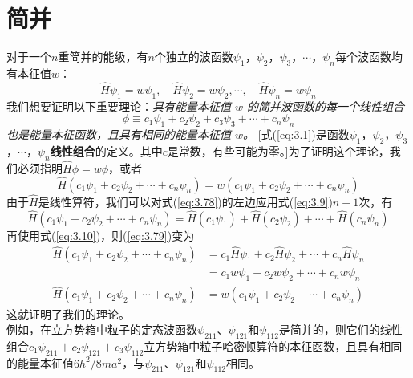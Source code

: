 \section{简并}
	对于一个$n$重简并的能级，有$n$个独立的波函数$\psi_1$，$\psi_2$，$\psi_3$，$\cdots$，$\psi_n$每个波函数均有本征值$w$：
	\begin{equation}
		\hat{H}\psi_1 = w\psi_1, \quad\hat{H}\psi_2 = w\psi_2, \cdots,\quad \hat{H}\psi_n = w\psi_n
		\label{eq:3.76}
	\end{equation}
	我们想要证明以下重要理论：\textit{具有能量本征值 $w$ 的简并波函数的每一个线性组合}
	\begin{equation}
		\phi \equiv c_1\psi_1 + c_2\psi_2 + c_3\psi_3 + \cdots + c_n\psi_n
		\label{eq:3.77}
	\end{equation}
	\textit{也是能量本征函数，且具有相同的能量本征值 $w$。} [式(\ref{eq:3.1})是函数$\psi_1$，$\psi_2$，$\psi_3$，$\cdots$，$\psi_n$\textbf{线性组合}的定义。其中$c$是常数，有些可能为零。]为了证明这个理论，我们必须指明$\hat{H}\phi = w\phi$，或者
	\begin{equation}
		\hat{H}\left(c_1\psi_1 + c_2\psi_2 +  \cdots + c_n\psi_n\right) = w\left(c_1\psi_1 + c_2\psi_2 + \cdots + c_n\psi_n\right)
		\label{eq:3.78}
	\end{equation}	
	由于$\hat{H}$是线性算符，我们可以对式(\ref{eq:3.78})的左边应用式(\ref{eq:3.9})$n-1$次，有
	\begin{equation*}
		\hat{H}\left(c_1\psi_1 + c_2\psi_2 +  \cdots + c_n\psi_n\right) = \hat{H}\left(c_1\psi_1\right) + \hat{H}\left(c_2\psi_2\right) + \cdots + \hat{H}\left(c_n\psi_n\right)
	\end{equation*}
	再使用式(\ref{eq:3.10})，则(\ref{eq:3.79})变为
	\begin{equation*}
		\begin{aligned}
			\hat{H}\left(c_1\psi_1 + c_2\psi_2 +  \cdots + c_n\psi_n\right) &= c_1\hat{H}\psi_1 + c_2\hat{H}\psi_2 +  \cdots + c_n\hat{H}\psi_n \\
			&= c_1w\psi_1 + c_2w\psi_2 +  \cdots + c_nw\psi_n \\
			\hat{H}\left(c_1\psi_1 + c_2\psi_2 +  \cdots + c_n\psi_n\right) &= w\left(c_1\psi_1 + c_2\psi_2 +  \cdots + c_n\psi_n\right)
		\end{aligned}
	\end{equation*}
	这就证明了我们的理论。\\
	\indent 例如，在立方势箱中粒子的定态波函数$\psi_{211}$、$\psi_{121}$和$\psi_{112}$是简并的，则它们的线性组合$c_1\psi_{211} + c_2\psi_{121} + c_3\psi_{112}$立方势箱中粒子哈密顿算符的本征函数，且具有相同的能量本征值$6h^2/8ma^2$，与$\psi_{211}$、$\psi_{121}$和$\psi_{112}$相同。\\
